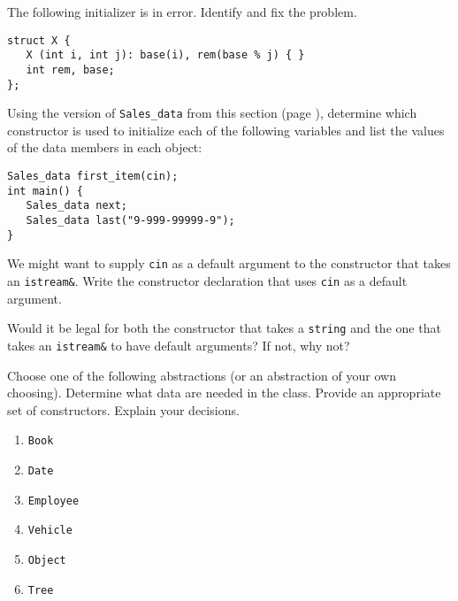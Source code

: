 %
%
\begin{question}
The following initializer is in error. Identify and fix the
problem.
\begin{lstlisting}
struct X {
   X (int i, int j): base(i), rem(base % j) { }
   int rem, base;
};
\end{lstlisting}
\end{question}

\begin{question}
Using the version of \verb|Sales_data| from this section (page \pageref{lst:default arguments and constructors}),
determine which constructor is used to initialize each of the following
variables and list the values of the data members in each object:
\begin{lstlisting}
Sales_data first_item(cin);
int main() {
   Sales_data next;
   Sales_data last("9-999-99999-9");
}
\end{lstlisting}
\end{question}

\begin{question}
We might want to supply \verb|cin| as a default argument to the
constructor that takes an \verb|istream&|. Write the constructor declaration that
uses \verb|cin| as a default argument.
\end{question}

\begin{question}
Would it be legal for both the constructor that takes a
\verb|string| and the one that takes an \verb|istream&| to have default arguments? If
not, why not?
\end{question}

\begin{question}\label{qst:determine what data are needed in the following abstractions}
Choose one of the following abstractions (or an abstraction
of your own choosing). Determine what data are needed in the class. Provide
an appropriate set of constructors. Explain your decisions.
\begin{enumerate}[label=(\alph*)]
^^I\item \verb|Book|
^^I\item \verb|Date|
^^I\item \verb|Employee|
^^I\item \verb|Vehicle|
^^I\item \verb|Object|
^^I\item \verb|Tree|
\end{enumerate}
\end{question}
